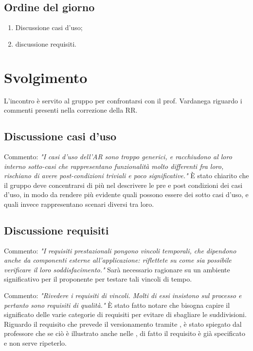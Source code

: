 \documentclass[]{article}
\begin{document}
		\subsection{Ordine del giorno}
		\begin{enumerate}
			\item Discussione casi d'uso;
			\item discussione requisiti.
		\end{enumerate}
\newpage	
	\section{Svolgimento}
	L'incontro è servito al gruppo per confrontarsi con il prof. Vardanega riguardo i commenti presenti nella correzione della RR.
	
		\subsection{Discussione casi d'uso}
		Commento: \textit{"I casi d’uso dell’AR sono troppo generici, e racchiudono al loro interno sotto-casi che rappresentano funzionalità molto differenti fra loro, rischiano di avere post-condizioni triviali e poco significative."}
		\newline
		È stato chiarito che il gruppo deve concentrarsi di più nel descrivere le pre e post condizioni dei casi d'uso, in modo da rendere più evidente quali possono essere dei sotto casi d'uso, e quali invece rappresentano scenari diversi tra loro.
				
	
		\subsection{Discussione requisiti}
		Commento: \textit{"I requisiti prestazionali pongono vincoli temporali, che dipendono anche da componenti esterne all’applicazione: riflettete su come sia possibile verificare il loro soddisfacimento."}
		\newline
		Sarà necessario ragionare su un ambiente significativo per il proponente per testare tali vincoli di tempo. \vspace{0.3cm}

		\noindent Commento: \textit{"Rivedere i requisiti di vincoli. Molti di essi insistono sul processo e pertanto sono requisiti di qualità."}
		\newline
		È stato fatto notare che bisogna capire il significato delle varie categorie di requisiti per evitare di sbagliare le suddivisioni. Riguardo il requisito che prevede il versionamento tramite , è stato spiegato dal professore che se ciò è illustrato anche nelle , di fatto il requisito è già specificato e non serve ripeterlo.\vspace{0.3cm}
		
\end{document}
